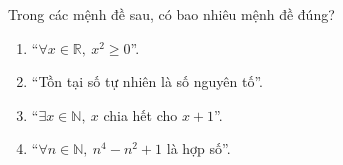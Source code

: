 \begin{ex}
Trong các mệnh đề sau, có bao nhiêu mệnh đề đúng?
\begin{enumerate}[label=\alph*)]
\item ``$\forall x\in\mathbb R,\ x^2\ge0$''.
\item ``Tồn tại số tự nhiên là số nguyên tố''.
\item ``$\exists x\in\mathbb N,\ x$ chia hết cho $x+1$''.
\item ``$\forall n\in\mathbb N,\ n^4-n^2+1$ là hợp số''.
\end{enumerate}
\end{ex}
